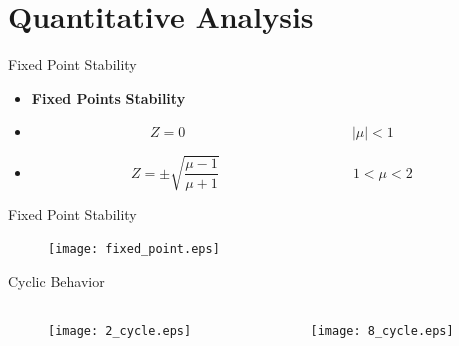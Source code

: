 \documentclass{beamer}
\begin{document}
\section{Quantitative Analysis}
\begin{frame}{Fixed Point Stability}
	\begin{itemize}
		\item
			\textbf{Fixed Points}\hspace{5cm} \textbf{Stability}
		\item
			\begin{equation*}
				Z=0 \hspace{5cm} \lvert \mu \rvert<1
			\end{equation*}
		\pause
		\item
			\begin{equation*}
				Z=\pm\sqrt{\frac{\mu-1}{\mu+1}} \hspace{4cm} 1<\mu<2
			\end{equation*}
	\end{itemize}
\end{frame}

\begin{frame}{Fixed Point Stability}
	\begin{figure}
		\centering
		\texttt{[image: fixed\_point.eps]}
	\end{figure}
\end{frame}

\begin{frame}{Cyclic Behavior}
	\begin{columns}
		\begin{column}{0.5\textwidth}
			\begin{figure}
				\centering
				\texttt{[image: 2\_cycle.eps]}
			\end{figure}
		\end{column}
		\begin{column}{0.5\textwidth}
			\begin{figure}
				\centering
				\texttt{[image: 8\_cycle.eps]}
			\end{figure}
		\end{column}
	\end{columns}
\end{frame}
\end{document}
